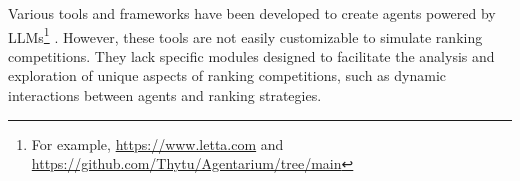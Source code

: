  Various tools and frameworks have been developed to create agents powered by LLMs\footnote{For example, \url{https://www.letta.com} and \url{https://github.com/Thytu/Agentarium/tree/main}} \cite{feng_agile_2024, qiao_taskweaver_2024, liu_agentlite_2024}. However, these tools are not easily customizable to simulate ranking competitions. They lack specific modules designed to facilitate the analysis and exploration of unique aspects of ranking competitions, such as dynamic interactions between agents and ranking strategies.

